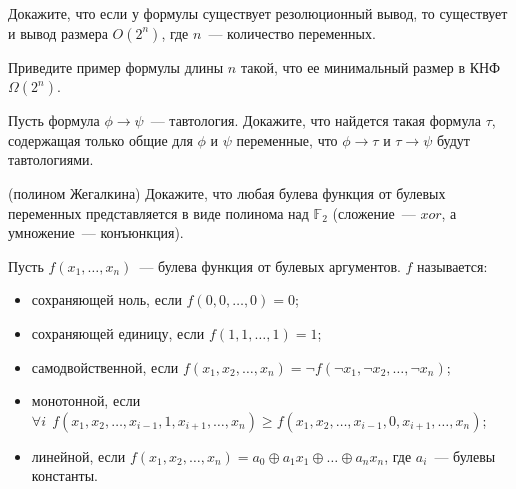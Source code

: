 \setcounter{curtask}{33}


\begin{task}
    Докажите, что если у формулы существует резолюционный вывод, то
    существует и вывод размера $O(2^n)$, где $n$~--- количество переменных.
\end{task}

\begin{task}
    Приведите пример формулы длины $n$ такой, что ее минимальный
    размер в КНФ $\Omega(2^n)$.
\end{task}

\begin{task}
    Пусть формула $\phi \rightarrow \psi$~--- тавтология. Докажите,
    что найдется такая формула $\tau$, содержащая только общие для
    $\phi$ и $\psi$ переменные, что $\phi \rightarrow \tau$ и
    $\tau \rightarrow \psi$ будут тавтологиями.
\end{task}

\begin{task}(полином Жегалкина)
    Докажите, что любая булева функция от булевых переменных
    представляется в виде полинома над $\mathbb{F}_2$ (сложение~---
    $xor$, а умножение~--- конъюнкция).
\end{task}


Пусть $f(x_1, \dots, x_n)$~--- булева функция от булевых аргументов.
$f$ называется:
\begin{itemize}
	\item сохраняющей ноль, если $f(0, 0, \dots, 0) = 0$;
	\item сохраняющей единицу, если $f(1, 1, \dots, 1) = 1$;
	\item самодвойственной, если $f(x_1, x_2, \dots, x_n) = \neg
		f(\neg x_1, \neg x_2, \dots, \neg x_n)$;
    \item монотонной, если
		$\forall i~~ f(x_1, x_2, \dots, x_{i - 1}, 1, x_{i + 1},
        \dots,  x_n) \ge f(x_1, x_2, \dots, x_{i - 1}, 0, x_{i + 1},
        \dots,  x_n)$;
    \item линейной, если $f(x_1, x_2, \dots, x_n) = a_0 \oplus a_1x_1
		\oplus \dots \oplus a_nx_n$, где $a_i$~--- булевы константы.
\end{itemize}

